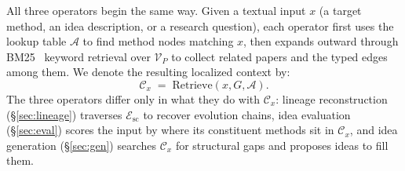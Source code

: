 \documentclass{opendatalab}
\begin{document}
All three operators begin the same way. Given a textual input $x$ (a target method, an idea description, or a research
 question), each operator first uses the lookup table $\mathcal{A}$ to find method nodes matching $x$, then expands
outward through BM25~\cite{10.1561/1500000019} keyword retrieval over $\mathcal{V}_P$ to collect related papers and
the typed edges among them. We denote the resulting localized context by:
\begin{equation}
\mathcal{C}_x \;=\; \mathrm{Retrieve}(x, G, \mathcal{A}).
\label{eq:retrieve}
\end{equation}
The three operators differ only in what they do with $\mathcal{C}_x$: lineage reconstruction (§\ref{sec:lineage})
traverses $\mathcal{E}_{\text{sc}}$ to recover evolution chains, idea evaluation (§\ref{sec:eval}) scores the input by
 where its constituent methods sit in $\mathcal{C}_x$, and idea generation (§\ref{sec:gen}) searches $\mathcal{C}_x$
for structural gaps and proposes ideas to fill them.
\end{document}
